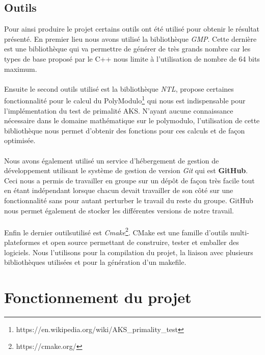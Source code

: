 		\subsection{Outils}
		Pour ainsi produire le projet certains outils ont été utilisé pour obtenir le résultat présenté. En premier lieu nous avons utilisé la bibliothèque \textit{GMP}.  Cette dernière est une bibliothèque qui va permettre de générer de très grands nombre car les types de base proposé par le C++ nous limite à l'utilisation de nombre de 64 bits maximum.
		\paragraph{}Ensuite le second outils utilisé est la bibliothèque \textit{NTL}, propose certaines fonctionnalité pour le calcul du PolyModulo\footnote{https://en.wikipedia.org/wiki/AKS\_primality\_test} qui nous est indispensable pour l'implémentation du test de primalité AKS. N'ayant aucune connaissance nécessaire dans le domaine mathématique sur le polymodulo, l'utilisation de cette bibliothèque nous permet d'obtenir des fonctions pour ces calculs et de façon optimisée.  
		\paragraph{}Nous avons également utilisé un service d’hébergement de gestion de développement utilisant le système de gestion de version \textit{Git} qui est \textbf{GitHub}. Ceci nous a permis de travailler en groupe sur un dépôt de façon très facile tout en étant indépendant lorsque chacun devait travailler de son côté sur une fonctionnalité sans pour autant perturber le travail du reste du groupe. GitHub nous permet également de stocker les différentes versions de notre travail.   
		\paragraph{}Enfin le dernier outilsutilisé est \textit{Cmake}\footnote{https://cmake.org/}. CMake est une famille d'outils multi-plateformes et open source permettant de construire, tester et emballer des logiciels. Nous l'utilisons pour la compilation du projet, la liaison avec plusieurs bibliothèques utilisées et pour la génération d'un makefile. 
		
	\section{Fonctionnement du projet}

